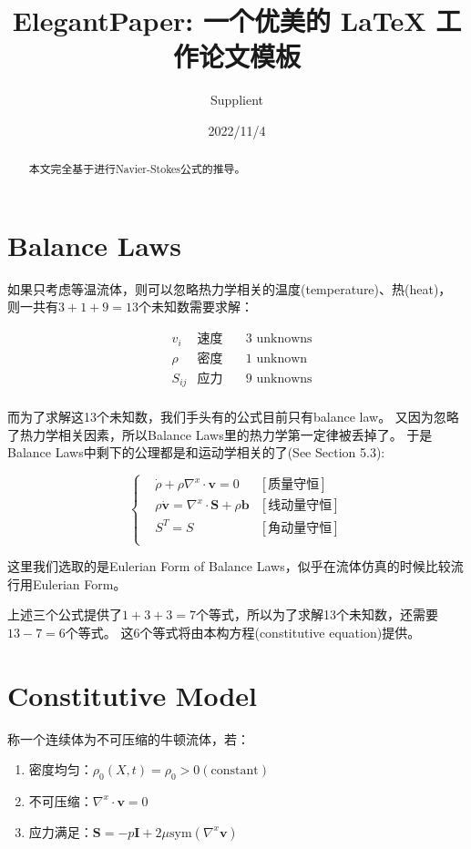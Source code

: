 \documentclass[lang=cn, a4paper,chinesefont=founder,bibend=bibtex]{elegantpaper}
\title{ElegantPaper: 一个优美的 \LaTeX{} 工作论文模板}
\author{Supplient}
\institute{\href{https://supplient.github.io/blogs/}{My Blog}}
\date{2022/11/4}
\begin{document}
\maketitle

\begin{abstract}
本文完全基于\cite{gonzalezFirstCourseContinuum2008}进行Navier-Stokes公式的推导。
\end{abstract}

\section{Balance Laws}
如果只考虑等温流体，则可以忽略热力学相关的温度(temperature)、热(heat)，
则一共有$3+1+9=13$个未知数需要求解：

$$
\begin{aligned}
& v_i & 速度 & \quad \text{3 unknowns} \\
& \rho & 密度 & \quad \text{1 unknown} \\
& S_{ij} & 应力 & \quad \text{9 unknowns} \\
\end{aligned}
$$

而为了求解这13个未知数，我们手头有的公式目前只有balance law。
又因为忽略了热力学相关因素，所以Balance Laws里的热力学第一定律被丢掉了。
于是Balance Laws中剩下的公理都是和运动学相关的了(See Section 5.3): 

$$
\left\{
\begin{aligned}
%
& \dot{\rho} + \rho\nabla^x\cdot \bm{v} = 0 & [\text{质量守恒}] \\
& \rho\dot{\bm{v}} = \nabla^x\cdot \bm{S} + \rho \bm{b} & [\text{线动量守恒}] \\
& S^T = S & [\text{角动量守恒}] \\
%
\end{aligned}
\right.
$$

这里我们选取的是Eulerian Form of Balance Laws，似乎在流体仿真的时候比较流行用Eulerian Form。

上述三个公式提供了$1+3+3=7$个等式，所以为了求解13个未知数，还需要$13-7=6$个等式。
这6个等式将由本构方程(constitutive equation)提供。

\section{Constitutive Model}
称一个连续体为不可压缩的牛顿流体，若：
\begin{enumerate}
	\item 密度均匀：$\rho_0(X, t)=\rho_0>0(\text{constant})$
	\item 不可压缩：$\nabla^x\cdot \bm{v} = 0$
	\item 应力满足：$\bm{S}=-p\bm{I}+2\mu \mathrm{sym}(\nabla^x\bm{v})$
\end{enumerate}
\end{document}
